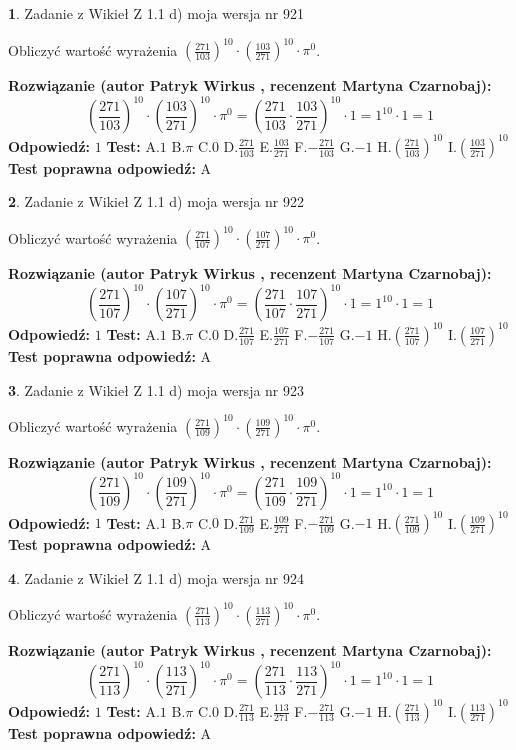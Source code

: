 \documentclass[12pt, a4paper]{article}
\theoremstyle{definition} %
\newtheorem{zad}{}
\newcommand{\zadStart}[1]{\begin{zad}#1\newline}
\newcommand{\zadStop}{\end{zad}}
\newcommand{\rozwStart}[2]{\noindent \textbf{Rozwiązanie (autor #1 , recenzent #2): }\newline}
\newcommand{\rozwStop}{\newline}
\newcommand{\odpStart}{\noindent \textbf{Odpowiedź:}\newline}
\newcommand{\odpStop}{\newline}
\newcommand{\testStart}{\noindent \textbf{Test:}\newline}
\newcommand{\testStop}{\newline}
\newcommand{\kluczStart}{\noindent \textbf{Test poprawna odpowiedź:}\newline}
\newcommand{\kluczStop}{\newline}
\begin{document}
\zadStart{Zadanie z Wikieł Z 1.1 d) moja wersja nr 921}

Obliczyć wartość wyrażenia $(\frac{271}{103})^{10} \cdot (\frac{103}{271})^{10} \cdot \pi^{0}$.
\zadStop
\rozwStart{Patryk Wirkus}{Martyna Czarnobaj}
$$(\frac{271}{103})^{10} \cdot (\frac{103}{271})^{10} \cdot \pi^{0} = (\frac{271}{103} \cdot \frac{103}{271})^{10} \cdot 1 = 1^{10} \cdot 1 = 1$$
\rozwStop
\odpStart
$1$
\odpStop
\testStart
A.$1$ B.$\pi$ C.$0$ D.$\frac{271}{103}$ E.$\frac{103}{271}$
F.$-\frac{271}{103}$ G.$-1$
H.$(\frac{271}{103})^{10}$
I.$(\frac{103}{271})^{10}$
\testStop
\kluczStart
A
\kluczStop



\zadStart{Zadanie z Wikieł Z 1.1 d) moja wersja nr 922}

Obliczyć wartość wyrażenia $(\frac{271}{107})^{10} \cdot (\frac{107}{271})^{10} \cdot \pi^{0}$.
\zadStop
\rozwStart{Patryk Wirkus}{Martyna Czarnobaj}
$$(\frac{271}{107})^{10} \cdot (\frac{107}{271})^{10} \cdot \pi^{0} = (\frac{271}{107} \cdot \frac{107}{271})^{10} \cdot 1 = 1^{10} \cdot 1 = 1$$
\rozwStop
\odpStart
$1$
\odpStop
\testStart
A.$1$ B.$\pi$ C.$0$ D.$\frac{271}{107}$ E.$\frac{107}{271}$
F.$-\frac{271}{107}$ G.$-1$
H.$(\frac{271}{107})^{10}$
I.$(\frac{107}{271})^{10}$
\testStop
\kluczStart
A
\kluczStop



\zadStart{Zadanie z Wikieł Z 1.1 d) moja wersja nr 923}

Obliczyć wartość wyrażenia $(\frac{271}{109})^{10} \cdot (\frac{109}{271})^{10} \cdot \pi^{0}$.
\zadStop
\rozwStart{Patryk Wirkus}{Martyna Czarnobaj}
$$(\frac{271}{109})^{10} \cdot (\frac{109}{271})^{10} \cdot \pi^{0} = (\frac{271}{109} \cdot \frac{109}{271})^{10} \cdot 1 = 1^{10} \cdot 1 = 1$$
\rozwStop
\odpStart
$1$
\odpStop
\testStart
A.$1$ B.$\pi$ C.$0$ D.$\frac{271}{109}$ E.$\frac{109}{271}$
F.$-\frac{271}{109}$ G.$-1$
H.$(\frac{271}{109})^{10}$
I.$(\frac{109}{271})^{10}$
\testStop
\kluczStart
A
\kluczStop



\zadStart{Zadanie z Wikieł Z 1.1 d) moja wersja nr 924}

Obliczyć wartość wyrażenia $(\frac{271}{113})^{10} \cdot (\frac{113}{271})^{10} \cdot \pi^{0}$.
\zadStop
\rozwStart{Patryk Wirkus}{Martyna Czarnobaj}
$$(\frac{271}{113})^{10} \cdot (\frac{113}{271})^{10} \cdot \pi^{0} = (\frac{271}{113} \cdot \frac{113}{271})^{10} \cdot 1 = 1^{10} \cdot 1 = 1$$
\rozwStop
\odpStart
$1$
\odpStop
\testStart
A.$1$ B.$\pi$ C.$0$ D.$\frac{271}{113}$ E.$\frac{113}{271}$
F.$-\frac{271}{113}$ G.$-1$
H.$(\frac{271}{113})^{10}$
I.$(\frac{113}{271})^{10}$
\testStop
\kluczStart
A
\kluczStop
\end{document}
